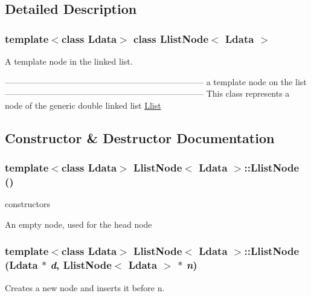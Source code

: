 \subsection{Detailed Description}
\subsubsection*{template$<$class Ldata$>$ class LlistNode$<$ Ldata $>$}

A template node in the linked list. 

----------------------------------------------------------------------- a template node on the list ----------------------------------------------------------------------- This class represents a node of the generic double linked list \hyperlink{classLlist}{Llist} 

\subsection{Constructor \& Destructor Documentation}
\hypertarget{classLlistNode_9e537419faf945c1be64fb8a994773f3}{
\subsubsection[{LlistNode}]{\setlength{\rightskip}{0pt plus 5cm}template$<$class Ldata$>$ {\bf LlistNode}$<$ Ldata $>$::{\bf LlistNode} ()}}
\label{classLlistNode_9e537419faf945c1be64fb8a994773f3}


constructors 

An empty node, used for the head node \hypertarget{classLlistNode_0257863d0b35acbdac9e297cadf90a04}{
\subsubsection[{LlistNode}]{\setlength{\rightskip}{0pt plus 5cm}template$<$class Ldata$>$ {\bf LlistNode}$<$ Ldata $>$::{\bf LlistNode} (Ldata $\ast$ {\em d}, \/  {\bf LlistNode}$<$ Ldata $>$ $\ast$ {\em n})}}
\label{classLlistNode_0257863d0b35acbdac9e297cadf90a04}


Creates a new node and inserts it before n. 

